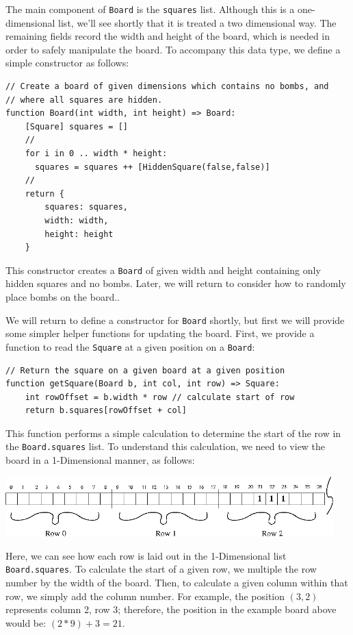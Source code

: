 The main component of \lstinline{Board} is the \lstinline{squares} list.  Although this is a one-dimensional list, we'll see shortly that it is treated a two dimensional way.  The remaining fields record the width and height of the board, which is needed in order to safely manipulate the board.  To accompany this data type, we define a simple constructor as follows:
\begin{lstlisting}
// Create a board of given dimensions which contains no bombs, and
// where all squares are hidden.
function Board(int width, int height) => Board:
    [Square] squares = []
    //
    for i in 0 .. width * height:
      squares = squares ++ [HiddenSquare(false,false)]
    //
    return {
        squares: squares,
        width: width,
        height: height
    }
\end{lstlisting}
This constructor creates a \lstinline{Board} of given width and height containing only hidden squares and no bombs.  Later, we will return to consider how to randomly place bombs on the board..

We will return to define a constructor for \lstinline{Board} shortly, but first we will provide some simpler helper functions for updating the board.  First, we provide a function to read the \lstinline{Square} at a given position on a \lstinline{Board}:

\begin{lstlisting}
// Return the square on a given board at a given position
function getSquare(Board b, int col, int row) => Square:
    int rowOffset = b.width * row // calculate start of row
    return b.squares[rowOffset + col]
\end{lstlisting}

This function performs a simple calculation to determine the start of the row in the \lstinline{Board.squares} list.  To understand this calculation, we need to view the board in a 1-Dimensional manner, as follows:

\begin{center}
\includegraphics[width=0.95\textwidth]{../images/kmines_flat.png}
\end{center}

Here, we can see how each row is laid out in the 1-Dimensional list \lstinline{Board.squares}.  To calculate the start of a given row, we multiple the row number by the width of the board.  Then, to calculate a given column within that row, we simply add the column number.  For example, the position $(3,2)$ represents column 2, row 3; therefore, the position in the example board above would be: $(2 * 9) + 3 = 21$.

